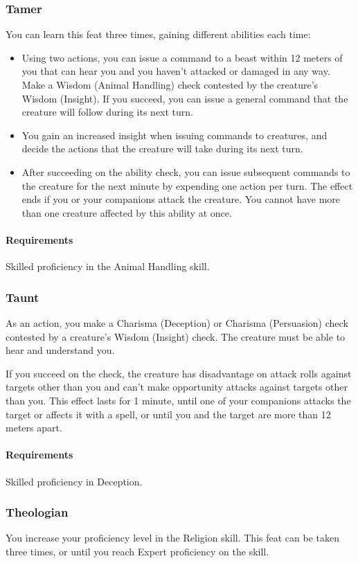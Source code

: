 \subsubsection{Tamer} \label{feat::tamer}
    You can learn this feat three times, gaining different abilities each time:
    \begin{itemize}
        \item Using two actions, you can issue a command to a beast within 12 meters of you that can hear you and you haven't attacked or damaged in any way.
        Make a Wisdom (Animal Handling) check contested by the creature's Wisdom (Insight).
        If you succeed, you can issue a general command that the creature will follow during its next turn.
        \item You gain an increased insight when issuing commands to creatures, and decide the actions that the creature will take during its next turn.
        \item After succeeding on the ability check, you can issue subsequent commands to the creature for the next minute by expending one action per turn.
        The effect ends if you or your companions attack the creature.
        You cannot have more than one creature affected by this ability at once.
    \end{itemize}
    \paragraph{Requirements} Skilled proficiency in the Animal Handling skill.
\subsubsection{Taunt} \label{feat::taunt}
    As an action, you make a Charisma (Deception) or Charisma (Persuasion) check contested by a creature's Wisdom (Insight) check.
    The creature must be able to hear and understand you.

    If you succeed on the check, the creature has disadvantage on attack rolls against targets other than you and can't make opportunity attacks against targets other than you.
    This effect lasts for 1 minute, until one of your companions attacks the target or affects it with a spell, or until you and the target are more than 12 meters apart.
    \paragraph{Requirements} Skilled proficiency in Deception.
\subsubsection{Theologian} \label{feat::theologian}
    You increase your proficiency level in the Religion skill.
    This feat can be taken three times, or until you reach Expert proficiency on the skill.
